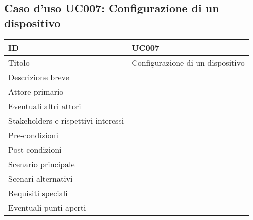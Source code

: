 \documentclass[../../main.tex]{subfiles}
\begin{document}
\subsection{Caso d’uso UC007: Configurazione di un dispositivo  }
\begin{tabularx}{150mm}{|l|X|}
    \hline
    ID                                  & \textbf{UC007}\\
    \hline
    Titolo                              & Configurazione di un dispositivo \\
    \hline
    Descrizione breve                   &    \\
    \hline
    Attore primario                     &    \\
    \hline
    Eventuali altri attori              &    \\
    \hline
    Stakeholders e rispettivi interessi &    \\
    \hline
    Pre-condizioni                      &    \\
    \hline
    Post-condizioni                     &    \\
    \hline
    Scenario principale                 &    \\
    \hline
    Scenari alternativi                 &    \\
    \hline
    Requisiti speciali                  &    \\
    \hline
    Eventuali punti aperti              &    \\
    \hline
\end{tabularx}
\newpage
\end{document}
